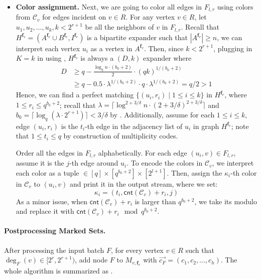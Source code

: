 \documentclass[11pt,a4paper]{article}
\newcommand{\ceil}[1]{\lceil #1 \rceil}
\newcommand{\freq}{\mathbf{f}}
\newcommand{\clr}{\mathcal{C}}
\newcommand{\cnt}{\mathsf{cnt}}
\newcommand{\brac}[1]{\left(#1\right)}
\begin{document}
\begin{itemize}
	\item \textbf{Color assignment.} Next, we are going to color all edges in $F_{l, r}$ using colors from $\clr_v$ for edges incident on $v\in R$. For any vertex $v\in R$, let $u_1, u_2, \ldots, u_k, k<2^{r+1}$ be all the neighbors of $v$ in $F_{l, r}$.
	Recall that $H^{\freq_v} = (A^{\freq_v}\cup B^{\freq_v}, I^{\freq_v})$ is a bipartite expander such that $|A^{\freq_v}|\geq n$, we can interpret each vertex $u_i$ as a vertex in $A^{\freq_v}$. Then, since $k<2^{r+1}$, plugging in $K =k$ in using , $H^{\freq_v}$ is always a $(D, k)$ expander where
	$$\begin{aligned}
		D &\geq q - \frac{\log_q n\cdot (b_0+2)}{2}\cdot (qk)^{1/(b_0+2)}\\
		&\geq q - 0.5\cdot\lambda^{1 / (b_0+2)} \cdot q\cdot \lambda^{1/(b_0+2)} = q/2 > 1
	\end{aligned}$$
	Hence, we can find a perfect matching $\{(u_i, r_i)\mid 1\leq i\leq k\}$ in $H^{\freq_v}$, where $1\leq r_i\leq q^{b_0+2}$; recall that $\lambda = \ceil{\log^{2+3/\delta}n\cdot (2 + 3/\delta)^{2+3/\delta}}$ and $b_0 = \ceil{\log_q(\lambda\cdot 2^{r+1})} < 3/\delta$ by . Additionally, assume for each $1\leq i\leq k$, edge $(u_i, r_i)$ is the $t_i$-th edge in the adjacency list of $u_i$ in graph $H^{{\freq_v}}$; note that $1\leq t_i\leq q$ by construction of multiplicity codes.
	
	Order all the edges in $F_{l, r}$ alphabetically. For each edge $(u_i, v)\in F_{l, r}$, assume it is the $j$-th edge around $u_i$. To encode the colors in $\clr_v$, we interpret each color as a tuple $\in [q]\times [q^{b_0+2}]\times [2^{l+1}]$. Then, assign the $\kappa_i$-th color in $\clr_v$ to $(u_i, v)$ and print it in the output stream, where we set:
	$$\kappa_i = \brac{t_i, \cnt(\clr_v) + r_i, j}$$
	As a minor issue, when $\cnt(\clr_v) + r_i$ is larger than $q^{b_0+2}$, we take its modulo and replace it with $\cnt(\clr_v) + r_i \mod q^{b_0+2}$.
\end{itemize}

\paragraph*{Postprocessing Marked Sets.} After processing the input batch $F$, for every vertex $v\in R$ such that $\deg_F(v)\in [2^r, 2^{r+1})$, add node $F$ to $M_{v, \freq_v}$ with $\overrightarrow{c_F} = (c_1, c_2, \ldots, c_h)$. The whole algorithm is summarized as .
\end{document}
